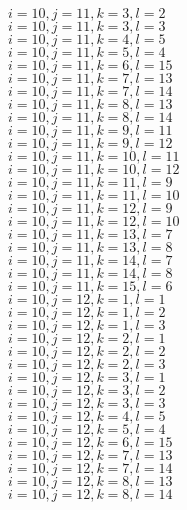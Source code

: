 \documentclass[14pt]{article}
\begin{document}
    $i=10,j=11,k=3,l=2 $ \\ 
    $i=10,j=11,k=3,l=3 $ \\ 
    $i=10,j=11,k=4,l=5 $ \\ 
    $i=10,j=11,k=5,l=4 $ \\ 
    $i=10,j=11,k=6,l=15 $ \\ 
    $i=10,j=11,k=7,l=13 $ \\ 
    $i=10,j=11,k=7,l=14 $ \\ 
    $i=10,j=11,k=8,l=13 $ \\ 
    $i=10,j=11,k=8,l=14 $ \\ 
    $i=10,j=11,k=9,l=11 $ \\ 
    $i=10,j=11,k=9,l=12 $ \\ 
    $i=10,j=11,k=10,l=11 $ \\ 
    $i=10,j=11,k=10,l=12 $ \\ 
    $i=10,j=11,k=11,l=9 $ \\ 
    $i=10,j=11,k=11,l=10 $ \\ 
    $i=10,j=11,k=12,l=9 $ \\ 
    $i=10,j=11,k=12,l=10 $ \\ 
    $i=10,j=11,k=13,l=7 $ \\ 
    $i=10,j=11,k=13,l=8 $ \\ 
    $i=10,j=11,k=14,l=7 $ \\ 
    $i=10,j=11,k=14,l=8 $ \\ 
    $i=10,j=11,k=15,l=6 $ \\ 
    $i=10,j=12,k=1,l=1 $ \\ 
    $i=10,j=12,k=1,l=2 $ \\ 
    $i=10,j=12,k=1,l=3 $ \\ 
    $i=10,j=12,k=2,l=1 $ \\ 
    $i=10,j=12,k=2,l=2 $ \\ 
    $i=10,j=12,k=2,l=3 $ \\ 
    $i=10,j=12,k=3,l=1 $ \\ 
    $i=10,j=12,k=3,l=2 $ \\ 
    $i=10,j=12,k=3,l=3 $ \\ 
    $i=10,j=12,k=4,l=5 $ \\ 
    $i=10,j=12,k=5,l=4 $ \\ 
    $i=10,j=12,k=6,l=15 $ \\ 
    $i=10,j=12,k=7,l=13 $ \\ 
    $i=10,j=12,k=7,l=14 $ \\ 
    $i=10,j=12,k=8,l=13 $ \\ 
    $i=10,j=12,k=8,l=14 $ \\ 
\end{document}
